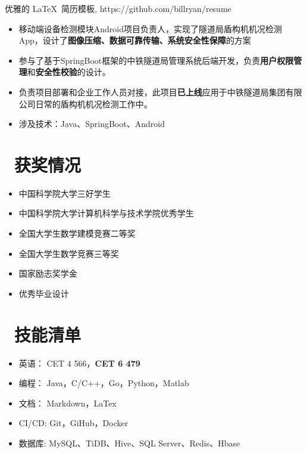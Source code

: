 \documentclass{resume}
\begin{document}
\begin{onehalfspacing}
优雅的 \LaTeX\ 简历模板, https://github.com/billryan/resume
\begin{itemize}
  \item 移动端设备检测模块Android项目负责人，实现了隧道局盾构机机况检测App，设计了\textbf{图像压缩、数据可靠传输、系统安全性保障}的方案
  \item 参与了基于SpringBoot框架的中铁隧道局管理系统后端开发，负责\textbf{用户权限管理}和\textbf{安全性校验}的设计。
  \item 负责项目部署和企业工作人员对接，此项目\textbf{已上线}应用于中铁隧道局集团有限公司日常的盾构机机况检测工作中。
  \item 涉及技术：Java、SpringBoot、Android
\end{itemize}
\end{onehalfspacing}


\section{\faHeartO\ 获奖情况}
\begin{itemize}[parsep=0.5ex]
  \item 中国科学院大学三好学生
  \item 中国科学院大学计算机科学与技术学院优秀学生
  \item 全国大学生数学建模竞赛二等奖
  \item 全国大学生数学竞赛三等奖
  \item 国家励志奖学金
  \item 优秀毕业设计
\end{itemize}

\section{\faCogs\ 技能清单}
\begin{itemize}[parsep=0.5ex]
  \item 英语：		CET 4 566，\textbf{CET 6 479}
  \item 编程：		Java，C/C++，Go，Python，Matlab
  \item 文档：		Markdown，LaTex
  \item CI/CD:		Git，GiHub，Docker
  \item 数据库:		MySQL、TiDB、Hive、SQL Server、Redis、Hbase
  
\end{itemize}



%
%
\end{document}
